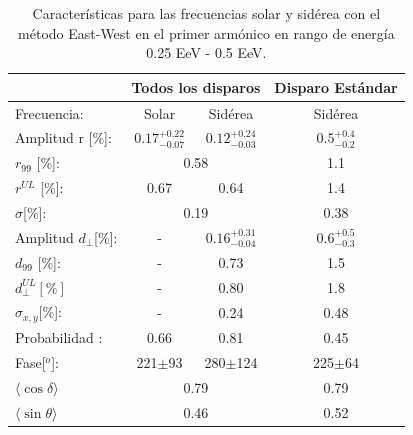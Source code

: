 \begin{table}[H]
    \begin{small}
        \begin{center}
            \begin{tabular}[c]{l|c|c||c|}
\cline{2-4}                                       & \multicolumn{2}{c||}{Todos los disparos}    & \multicolumn{1}{c|}{Disparo Estándar}   \\ \hline
\multicolumn{1}{|l|}{Frecuencia:                } & Solar	                & Sidérea	                & Sidérea \cite{Aab_2020}   \\ \hline
\multicolumn{1}{|l|}{Amplitud r [\%]:           } & $0.17^{+0.22}_{-0.07}$	& $0.12^{+0.24}_{-0.03}$ 	& $0.5^{+0.4}_{-0.2}$ \cite{codigo}      \\
\multicolumn{1}{|l|}{$r_{99}$ [\%]:             } & \multicolumn{2}{c||}{0.58}                          & 1.1\cite{codigo}                 \\
\multicolumn{1}{|l|}{$r^{UL}$ [\%]:             } & 0.67 	                & 0.64                      & 1.4\cite{codigo}                 \\ 
\multicolumn{1}{|l|}{$\sigma$[\%]:              } & \multicolumn{2}{c||}{0.19}                          & 0.38\cite{codigo}       \\\hline
\multicolumn{1}{|l|}{Amplitud $d_\perp$[\%]:    } & -	                    & $0.16^{+0.31}_{-0.04}$ 	& $0.6^{+0.5}_{-0.3}$       \\
\multicolumn{1}{|l|}{$d_{99}$ [\%]:             } & - 	                    & 0.73                      & 1.5  \cite{codigo}                \\
\multicolumn{1}{|l|}{$d_{\perp}^{UL}[\%]$       } & -                       & 0.80                      & 1.8                         \\
\multicolumn{1}{|l|}{$\sigma_{x,y}$[\%]:        } & -	                    & 0.24	                    & 0.48       \\\hline
\multicolumn{1}{|l|}{Probabilidad      :        } & 0.66                    & 0.81	                    & 0.45       \\
\multicolumn{1}{|l|}{Fase[$^o$]:                } & 221$\pm$93              & 280$\pm$124                & 225$\pm$64\\ \hline
\multicolumn{1}{|l|}{$\langle\cos\delta \rangle$} & \multicolumn{2}{c||}{0.79}        	                & 0.79 \cite{codigo}        \\        
\multicolumn{1}{|l|}{$\langle\sin\theta \rangle$} & \multicolumn{2}{c||}{0.46}        	                & 0.52 \cite{codigo}        \\ \hline       
            \end{tabular}
            
        \end{center}
    \end{small}
    \caption{Características para las frecuencias solar y sidérea con el método East-West en el primer armónico en rango de energía 0.25 EeV - 0.5 EeV.}
    \label{tab:primer_bin_data}
\end{table}


